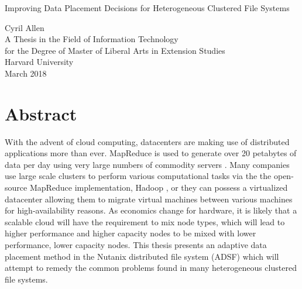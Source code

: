 \documentclass[12pt]{article}
\begin{document}
\begin{center}

  \vspace*{0.6in}
  Improving Data Placement Decisions for Heterogeneous Clustered File Systems

  \vspace{2.3in}
  Cyril Allen\\
  \vspace{1.8in}
  A Thesis in the Field of Information Technology\\
  for the Degree of Master of Liberal Arts in Extension Studies\\
  \vspace{.8in}
  Harvard University\\

  \vfill
  March 2018
  \vspace*{.5in}
\end{center}

\newpage
\null

\newpage

\section*{Abstract}
\thispagestyle{empty}

With the advent of cloud computing, datacenters are making use of distributed
applications more than ever. MapReduce is used to generate over 20 petabytes
of data per day using very large numbers of commodity servers
\cite{mapreduce}.  Many companies use large scale clusters to perform various
computational tasks via the the open-source MapReduce implementation, Hadoop
\cite{hadoop}, or they can possess a virtualized datacenter allowing them to
migrate virtual machines between various machines for high-availability
reasons. As economics change for hardware, it is likely that a scalable cloud
will have the requirement to mix node types, which will lead to higher
performance and higher capacity nodes to be mixed with lower performance,
lower capacity nodes. This thesis presents an adaptive data placement method
in the Nutanix distributed file system (ADSF) which will attempt to remedy
the common problems found in many heterogeneous clustered file systems.

\clearpage
\newpage
\end{document}
